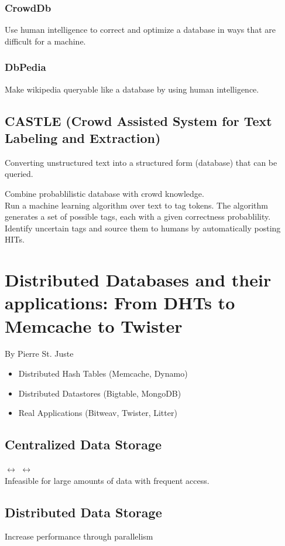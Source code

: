 \documentclass[12pt]{article}
\begin{document}
\subsubsection{CrowdDb}
Use human intelligence to correct and optimize a database in ways that are
difficult for a machine.

\subsubsection{DbPedia}
Make wikipedia queryable like a database by using human intelligence.

\subsection{CASTLE (Crowd Assisted System for Text Labeling and Extraction)}
Converting unstructured text into a structured form (database) that can be
queried.

Combine probablilistic database with crowd knowledge.\\
Run a machine learning algorithm over text to tag tokens. The algorithm
generates a set of possible tags, each with a given correctness probablility.
Identify uncertain tags and source them to humans by automatically posting HITs.

\section{
Distributed Databases and their applications: From DHTs to Memcache to Twister
}
By Pierre St. Juste\\
\begin{itemize}
  \item Distributed Hash Tables (Memcache, Dynamo)
  \item Distributed Datastores (Bigtable, MongoDB)
  \item Real Applications (Bitweav, Twister, Litter)
\end{itemize}

\subsection{Centralized Data Storage}
 $\leftrightarrow$
 $\leftrightarrow$
\\
Infeasible for large amounts of data with frequent access.
\subsection{Distributed Data Storage}
Increase performance through parallelism
\end{document}

